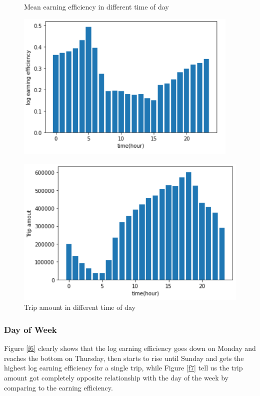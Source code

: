 \documentclass[11pt]{article}
\begin{document}
\begin{figure}[h]

\begin{minipage}{.5\textwidth}
    \centering
    \caption{Mean earning efficiency in different time of day}\label{f4}
    \includegraphics[width=0.95\textwidth]{earnTime.jpg}
\end{minipage}
\begin{minipage}{.5\textwidth}
    \centering
    \caption{Trip amount in different time of day} \label{f5}
    \includegraphics[width=1\textwidth]{plots/tripTime.jpg}
\end{minipage}
\end{figure}

\subsubsection{Day of Week}
Figure \ref{f6} clearly shows that the log earning efficiency goes down on Monday and reaches the bottom on Thursday, then starts to rise until Sunday and gets the highest log earning efficiency for a single trip, while Figure \ref{f7} tell us the trip amount got completely opposite relationship with the day of the week by comparing to the earning efficiency.
\end{document}
